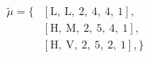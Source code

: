 \begin{equation}
\nonumber
\begin{aligned}
\tilde{\mu} = \{  & \left[\text{L}, \ \text{L}, \ \text{2}, \ \text{4}, \ \text{4}, \ \text{1}\right], \\  & \left[\text{H}, \ \text{M}, \ \text{2}, \ \text{5}, \ \text{4}, \ \text{1}\right], \\  & \left[\text{H}, \ \text{V}, \ \text{2}, \ \text{5}, \ \text{2}, \ \text{1}\right], \} \\ 
\end{aligned}
\end{equation} \\ 